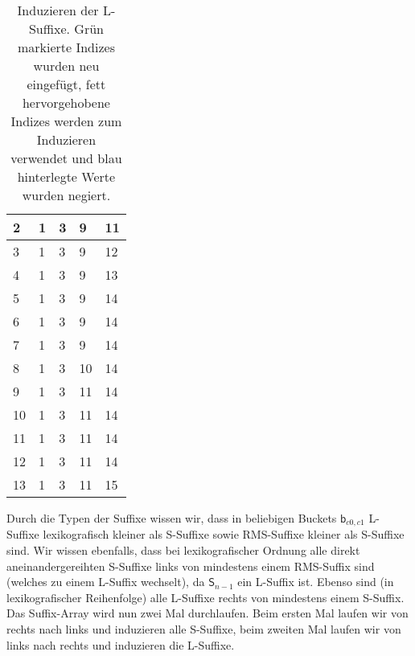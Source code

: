 \begin{table}
\begin{tabular}{l|l|l|l|l}
		2       & 1                 & \cellcolor[HTML]{32CB00}3 & 9                          & 11                         \\ \hline
		3       & 1                 & 3                         & 9                          & \cellcolor[HTML]{32CB00}12 \\ \hline
		4       & 1                 & 3                         & 9                          & \cellcolor[HTML]{32CB00}13 \\ \hline
		5       & 1                 & 3                         & 9                          & \cellcolor[HTML]{32CB00}14 \\ \hline
		6       & 1                 & 3                         & 9                          & 14                         \\ \hline
		7       & 1                 & 3                         & 9                          & 14                         \\ \hline
		8       & 1                 & 3                         & \cellcolor[HTML]{32CB00}10 & 14                         \\ \hline
		9       & 1                 & 3                         & \cellcolor[HTML]{32CB00}11 & 14                         \\ \hline
		10      & 1                 & 3                         & 11                         & 14                         \\ \hline
		11      & 1                 & 3                         & 11                         & 14                         \\ \hline
		12      & 1                 & 3                         & 11                         & 14                         \\ \hline
		13      & 1                 & 3                         & 11                         & \cellcolor[HTML]{32CB00}15 \\ \hline
	\end{tabular}%
	\caption{Induzieren der L-Suffixe. Grün markierte Indizes wurden neu eingefügt, fett hervorgehobene Indizes werden zum Induzieren verwendet und blau hinterlegte Werte wurden negiert.}
	\label{dss:table:induce-l}
\end{table}


Durch die Typen der Suffixe wissen wir, dass in beliebigen Buckets $\mathsf{b}_{c0,c1}$ L-Suffixe lexikografisch kleiner als S-Suffixe sowie RMS-Suffixe kleiner als S-Suffixe sind. Wir wissen ebenfalls, dass bei lexikografischer Ordnung alle direkt aneinandergereihten S-Suffixe links von mindestens einem RMS-Suffix sind (welches zu einem L-Suffix wechselt), da $\mathsf{S}_{n-1}$ ein L-Suffix ist. Ebenso sind (in lexikografischer Reihenfolge) alle L-Suffixe rechts von mindestens einem S-Suffix. Das Suffix-Array wird nun zwei Mal durchlaufen. Beim ersten Mal laufen wir von rechts nach links und induzieren alle S-Suffixe, beim zweiten Mal laufen wir von links nach rechts und induzieren die L-Suffixe.

